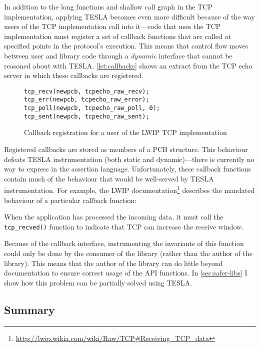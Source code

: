 In addition to the long functions and shallow call graph in the TCP
implementation, applying TESLA becomes even more difficult because of the way
users of the TCP implementation call into it---code that uses the TCP
implementation must register a set of callback functions that are called at
specified points in the protocol's execution. This means that control flow moves
between user and library code through a \emph{dynamic} interface that cannot be
reasoned about with TESLA. \autoref{lst:callbacks} shows an extract from the TCP
echo server in which these callbacks are registered.

\begin{figure}
  \begin{verbatim}
tcp_recv(newpcb, tcpecho_raw_recv);
tcp_err(newpcb, tcpecho_raw_error);
tcp_poll(newpcb, tcpecho_raw_poll, 0);
tcp_sent(newpcb, tcpecho_raw_sent);
  \end{verbatim}
  \caption{Callback registration for a user of the LWIP TCP implementation}
  \label{lst:callbacks}
\end{figure}

Registered callbacks are stored as members of a PCB structure. This
behaviour defeats TESLA instrumentation (both static and
dynamic)---there is currently no way to express  in the assertion language.
Unfortunately, these callback functions contain much of the behaviour
that would be well-served by TESLA instrumentation. For example, the
LWIP
documentation\footnote{\url{http://lwip.wikia.com/wiki/Raw/TCP\#Receiving_TCP_data}}
describes the mandated behaviour of a particular callback function:

\begin{displayquote}
When the application has processed the incoming data, it must call the
\texttt{tcp_recved()} function to indicate that TCP can increase
the receive window.
\end{displayquote}

Because of the callback interface, instrumenting the invariants of this
function could only be done by the consumer of the library (rather than
the author of the library). This means that the author of the library
can do little beyond documentation to ensure correct usage of the API
functions. In \autoref{sec:safer-libs} I show how this problem can be partially
solved using TESLA.

\subsection{Summary}

